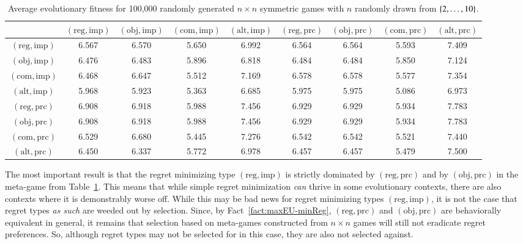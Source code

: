 \documentclass[fleqn,reqno,11pt]{article}
\begin{document}
\begin{table}[]
\centering
\footnotesize
\begin{tabular}{ccccccccc}
  \toprule
 & $(\text{reg}, \text{imp})$ 
 & $(\text{obj}, \text{imp})$ 
 & $(\text{com}, \text{imp})$
 & $(\text{alt}, \text{imp})$
 & $(\text{reg}, \text{prc})$ 
 & $(\text{obj}, \text{prc})$ 
 & $(\text{com}, \text{prc})$
 & $(\text{alt}, \text{prc})$ \\ 
  \midrule
  $(\text{reg}, \text{imp})$ & 6.567 & 6.570 & 5.650 & 6.992 & 6.564 & 6.564 & 5.593 & 7.409 \\
  $(\text{obj}, \text{imp})$ & 6.476 & 6.483 & 5.896 & 6.818 & 6.484 & 6.484 & 5.850 & 7.124 \\
  $(\text{com}, \text{imp})$ & 6.468 & 6.647 & 5.512 & 7.169 & 6.578 & 6.578 & 5.577 & 7.354 \\
  $(\text{alt}, \text{imp})$ & 5.968 & 5.923 & 5.363 & 6.685 & 5.975 & 5.975 & 5.086 & 6.973 \\
  $(\text{reg}, \text{prc})$ & 6.908 & 6.918 & 5.988 & 7.456 & 6.929 & 6.929 & 5.934 & 7.783 \\
  $(\text{obj}, \text{prc})$ & 6.908 & 6.918 & 5.988 & 7.456 & 6.929 & 6.929 & 5.934 & 7.783 \\
  $(\text{com}, \text{prc})$ & 6.529 & 6.680 & 5.445 & 7.276 & 6.542 & 6.542 & 5.521 & 7.440 \\
  $(\text{alt}, \text{prc})$ & 6.450 & 6.337 & 5.772 & 6.978 & 6.457 & 6.457 & 5.479 & 7.500 \\
   \bottomrule                         
\end{tabular}                      
\caption{Average evolutionary fitness for 100,000 randomly generated $n \times n$ symmetric games with $n$ randomly drawn from $\left\{2, \dots, 10\right\}$.}
\label{tab:ExpectedFitness_10x10}        
\end{table}

The most important result is that the regret minimizing type $(\text{reg}, \text{imp})$ is
strictly dominated by $(\text{reg}, \text{prc})$ and by $(\text{obj}, \text{prc})$ in the
meta-game from Table~\ref{tab:ExpectedFitness_10x10}. This means that while simple regret minimization
\emph{can} thrive in some evolutionary contexts, there are also contexts where it is
demonstrably worse off. While this may be bad news for regret minimizing types
$(\text{reg}, \text{imp})$, it is not the case that regret types \emph{as such} are weeded out
by selection. Since, by Fact~\ref{fact:maxEU-minReg}, $(\text{reg}, \text{prc})$ and
$(\text{obj}, \text{prc})$ are behaviorally equivalent in general, it remains that selection
based on meta-games constructed from $n \times n$ games will still not eradicate regret
preferences. So, although regret types may not be selected for in this case, they are also not
selected against.
\end{document}
